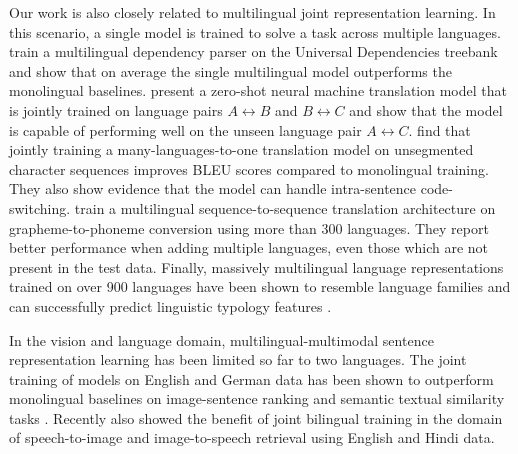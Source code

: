 Our work is also closely related to multilingual joint representation learning. 
In this scenario, a single model is trained to solve a task across multiple languages. 
\citet{ammar2016many} train a multilingual dependency parser on the Universal Dependencies treebank \cite{nivre2015universal} and show that on average the single multilingual model outperforms the monolingual baselines.  
\citet{johnson2016google} present a zero-shot neural machine translation model that is 
jointly trained on language pairs
$A \leftrightarrow B$ and $B \leftrightarrow C$ and show that the model is capable of performing well on the unseen
language pair $A \leftrightarrow C$. 
\citet{lee2017fully} find that jointly training a many-languages-to-one translation model on unsegmented character sequences improves BLEU scores compared to monolingual training. 
They also show evidence that the model can handle intra-sentence code-switching. 
\citet{peters2017massively} train a multilingual sequence-to-sequence translation architecture on grapheme-to-phoneme conversion using more than 300 languages. 
They report better performance when adding multiple languages, even those which are not present in the test data. 
%
Finally, massively multilingual language representations trained on over 900 languages have been shown to resemble language families \cite{ostling2016continuous} and can successfully predict linguistic typology features \cite{malaviya2017learning}. 

In the vision and language domain, multilingual-multimodal sentence representation learning has been limited so far to two languages. The joint training of models on English and German data has been shown to outperform monolingual baselines on image-sentence ranking and semantic textual similarity tasks \cite{gella2017image,calixto2017multilingual}. 
Recently \citet{harwath2018vision} also showed the benefit of joint bilingual training in the domain of speech-to-image and image-to-speech retrieval using English and Hindi data.   

